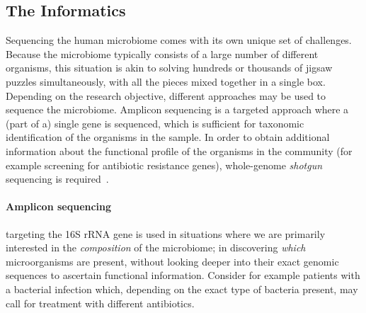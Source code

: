 \begin{justify}

\subsection{The Informatics}

Sequencing the human microbiome comes with its own unique set of challenges. Because the microbiome typically consists of a large number of different organisms, this situation is akin to solving hundreds or thousands of jigsaw puzzles simultaneously, with all the pieces mixed together in a single box. Depending on the research objective, different approaches may be used to sequence the microbiome. Amplicon sequencing is a targeted approach where a (part of a) single gene is sequenced, which is sufficient for taxonomic identification of the organisms in the sample. In order to obtain additional information about the functional profile of the organisms in the community (for example screening for antibiotic resistance genes), whole-genome \emph{shotgun} sequencing is required~\cite{ranjan2016analysis}.

\paragraph{Amplicon sequencing} targeting the 16S rRNA gene is used in situations where we are primarily interested in the \emph{composition} of the microbiome; in discovering \emph{which} microorganisms are present, without looking deeper into their exact genomic sequences to ascertain functional information. Consider for example patients with a bacterial infection which, depending on the exact type of bacteria present, may call for treatment with different antibiotics.


\end{justify}

